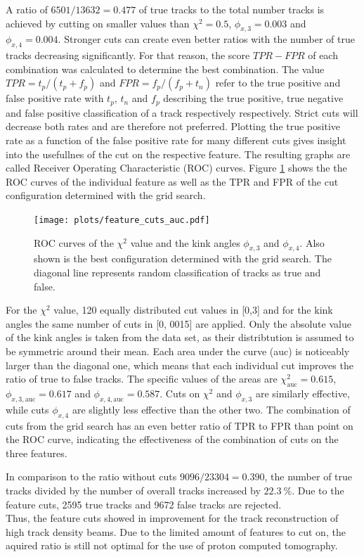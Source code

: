 A ratio of $6501/13632 = 0.477$ of true tracks to the total number tracks is achieved by cutting on smaller values than $\chi^2 = 0.5$, $\phi_{x,3} = 0.003$ and $\phi_{x,4}=0.004$.
Stronger cuts can create even better ratios with the number of true tracks decreasing significantly. For that reason, the score $TPR-FPR$ of each combination
was calculated to determine the best combination. The value $TPR = t_p/(t_p + f_p)$ and $FPR = f_p/(f_p + t_n)$
refer to the true positive and false positive rate with
$t_p$, $t_n$ and $f_p$ describing the true positive, true negative and false positive classification of a track respectively respectively.
Strict cuts will decrease both rates and are therefore not preferred. Plotting the
true positive rate as a function of the false positive rate for many different cuts gives insight into the usefullnes of the cut on the respective feature. The resulting
graphs are called Receiver Operating Characteristic (ROC) curves.
Figure \ref{fig:feature_grid} shows the the ROC curves of the individual feature as well as the TPR and FPR of the cut configuration determined with the grid search.

\begin{figure}
  \centering
  \texttt{[image: plots/feature\_cuts\_auc.pdf]}
  \caption{ROC curves of the $\chi^2$ value and the kink angles $\phi_{x,3}$ and $\phi_{x,4}$. Also shown is the best configuration determined with the grid search. The diagonal
  line represents random classification of tracks as true and false.}
  \label{fig:feature_grid}
\end{figure}


For the $\chi^2$ value, 120 equally distributed cut values in [0,3] and for the kink angles the same number of cuts in [0, 0015] are applied. Only the absolute value of the
kink angles is taken from the data set, as their distribtution is assumed to be symmetric around their mean. Each area under the curve (auc) is noticeably larger than the diagonal
one, which means that each individual cut improves the ratio of true to false tracks. The specific values of the areas are $\chi^2_{\text{auc}} = 0.615$,
$\phi_{x,3,\text{auc}} = 0.617$ and $\phi_{x,4,\text{auc}} = 0.587$. Cuts on $\chi^2$ and $\phi_{x,3}$ are similarly effective, while cuts $\phi_{x,4}$ are slightly
less effective than the other two. The combination of cuts from the grid search has an even better ratio of TPR to FPR than point on the ROC curve, indicating the
effectiveness of the combination of cuts on the three features.

In comparison to the ratio without cuts $9096/23304 = 0.390$, the number of true tracks divided by the number of overall tracks increased by $\SI{22.3}{\percent}$. Due to
the feature cuts, 2595 true tracks and 9672 false tracks are rejected. \\
Thus, the feature cuts showed in improvement for the track reconstruction of high track density beams. Due to the limited amount of features to cut on, the aquired ratio
is still not optimal for the use of proton computed tomography.
